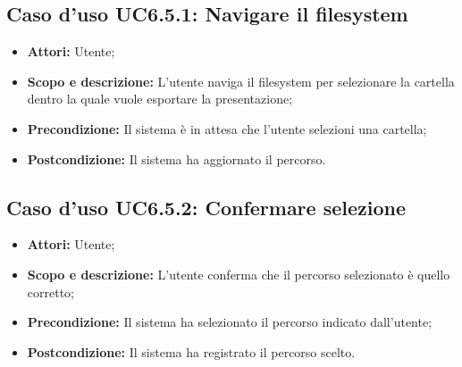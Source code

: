 	\subsection{Caso d'uso UC6.5.1: Navigare il filesystem}
	\begin{itemize}
		\item \textbf{Attori:} Utente;
		\item \textbf{Scopo e descrizione:} L'utente naviga il \gls{filesystem} per selezionare la cartella dentro la quale vuole esportare la presentazione;
		\item \textbf{Precondizione:} Il sistema è in attesa che l'utente selezioni una cartella;
		\item \textbf{Postcondizione:} Il sistema ha aggiornato il percorso.
	\end{itemize}

	\subsection{Caso d'uso UC6.5.2: Confermare selezione}
	\begin{itemize}
		\item \textbf{Attori:} Utente;
		\item \textbf{Scopo e descrizione:} L'utente conferma che il percorso selezionato è quello corretto;
		\item \textbf{Precondizione:} Il sistema ha selezionato il percorso indicato dall'utente;
		\item \textbf{Postcondizione:} Il sistema ha registrato il percorso scelto.
	\end{itemize}
